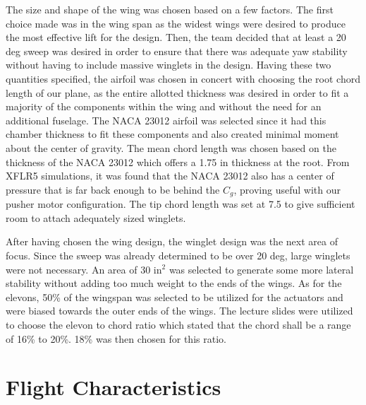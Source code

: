     The size and shape of the wing was chosen based on a few factors. The first choice made was in the wing span as the widest wings were desired to produce the most effective lift for the design. Then, the team decided that at least a 20 deg sweep was desired in order to ensure that there was adequate yaw stability without having to include massive winglets in the design. Having these two quantities specified, the airfoil was chosen in concert with choosing the root chord length of our plane, as the entire allotted thickness was desired in order to fit a majority of the components within the wing and without the need for an additional fuselage. The NACA 23012 airfoil was selected since it had this chamber thickness to fit these components and also created minimal moment about the center of gravity. The mean chord length was chosen based on the thickness of the NACA 23012 which offers a 1.75 in thickness at the root. From XFLR5 simulations, it was found that the NACA 23012 also has a center of pressure that is far back enough to be behind the $C_g$, proving useful with our pusher motor configuration. The tip chord length was set at 7.5 to give sufficient room to attach adequately sized winglets. 

    After having chosen the wing design, the winglet design was the next area of focus. Since the sweep was already determined to be over 20 deg, large winglets were not necessary. An area of 30 in$^2$ was selected to generate some more lateral stability without adding too much weight to the ends of the wings. As for the elevons, 50\% of the wingspan was selected to be utilized for the actuators and were biased towards the outer ends of the wings. The lecture slides were utilized to choose the elevon to chord ratio which stated that the chord shall be a range of 16\% to 20\%. 18\% was then chosen for this ratio.


\section{Flight Characteristics}

